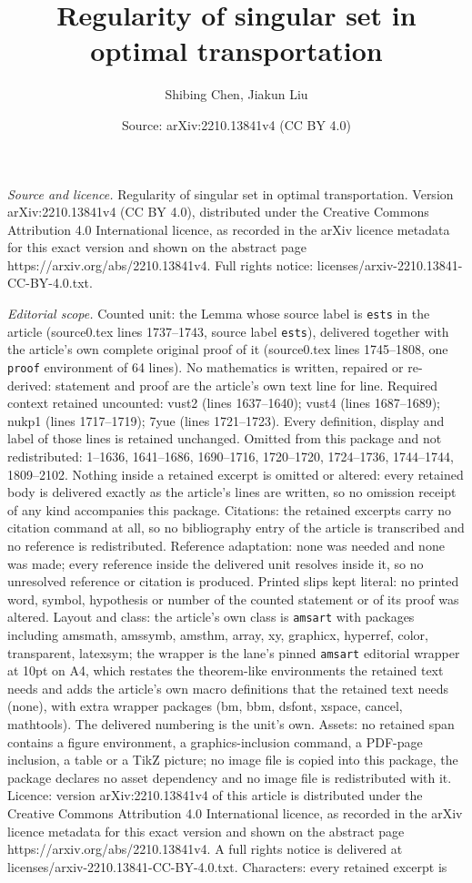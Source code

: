 \documentclass[10pt,a4paper]{amsart}
\title[Regularity of singular set in optimal transportation]{Regularity of singular set in optimal transportation}
\author{Shibing Chen, Jiakun Liu}
\date{Source: arXiv:2210.13841v4 (CC BY 4.0)}
\begin{document}
\maketitle

\noindent\emph{Source and licence.} Regularity of singular set in optimal transportation. Version arXiv:2210.13841v4 (CC BY 4.0), distributed under the Creative Commons Attribution 4.0 International licence, as recorded in the arXiv licence metadata for this exact version and shown on the abstract page https://arxiv.org/abs/2210.13841v4. Full rights notice: licenses/arxiv-2210.13841-CC-BY-4.0.txt.\par\smallskip

\noindent\textit{Editorial scope.} Counted unit: the Lemma whose source label is \texttt{ests} in the article (source0.tex lines 1737--1743, source label \texttt{ests}), delivered together with the article's own complete original proof of it (source0.tex lines 1745--1808, one \texttt{proof} environment of 64 lines). No mathematics is written, repaired or re-derived: statement and proof are the article's own text line for line. Required context retained uncounted: vust2 (lines 1637--1640); vust4 (lines 1687--1689); nukp1 (lines 1717--1719); 7yue (lines 1721--1723). Every definition, display and label of those lines is retained unchanged. Omitted from this package and not redistributed: 1--1636, 1641--1686, 1690--1716, 1720--1720, 1724--1736, 1744--1744, 1809--2102. Nothing inside a retained excerpt is omitted or altered: every retained body is delivered exactly as the article's lines are written, so no omission receipt of any kind accompanies this package. Citations: the retained excerpts carry no citation command at all, so no bibliography entry of the article is transcribed and no reference is redistributed. Reference adaptation: none was needed and none was made; every reference inside the delivered unit resolves inside it, so no unresolved reference or citation is produced. Printed slips kept literal: no printed word, symbol, hypothesis or number of the counted statement or of its proof was altered. Layout and class: the article's own class is \texttt{amsart} with packages including amsmath, amssymb, amsthm, array, xy, graphicx, hyperref, color, transparent, latexsym; the wrapper is the lane's pinned \texttt{amsart} editorial wrapper at 10pt on A4, which restates the theorem-like environments the retained text needs and adds the article's own macro definitions that the retained text needs (none), with extra wrapper packages (bm, bbm, dsfont, xspace, cancel, mathtools). The delivered numbering is the unit's own. Assets: no retained span contains a figure environment, a graphics-inclusion command, a PDF-page inclusion, a table or a TikZ picture; no image file is copied into this package, the package declares no asset dependency and no image file is redistributed with it. Licence: version arXiv:2210.13841v4 of this article is distributed under the Creative Commons Attribution 4.0 International licence, as recorded in the arXiv licence metadata for this exact version and shown on the abstract page https://arxiv.org/abs/2210.13841v4. A full rights notice is delivered at licenses/arxiv-2210.13841-CC-BY-4.0.txt. Characters: every retained excerpt is 
\end{document}
